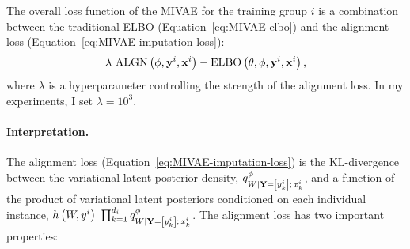 \documentclass[../thesis.tex]{subfiles}
\begin{document}
The overall loss function of the MIVAE for the training group $i$ is a combination between the traditional ELBO (Equation~\ref{eq:MIVAE-elbo}) and the alignment loss (Equation~\ref{eq:MIVAE-imputation-loss}):
\begin{equation}
    \lambda ~ \mathrm{ALGN} \left( \phi, \mathbf{{y}}^i, \mathbf{{x}}^i \right) - \mathrm{ELBO} \left( \theta, \phi, \mathbf{{y}}^i, \mathbf{{x}}^i \right),
\end{equation}
where $\lambda$ is a hyperparameter controlling the strength of the alignment loss. In my experiments, I set $\lambda = 10^3$.

\paragraph{Interpretation.} The alignment loss (Equation~\ref{eq:MIVAE-imputation-loss}) is the KL-divergence between the variational latent posterior density, $\myfunc{q}^{\phi}_{\myrv{w} | \mygroup{\myrv{y}} = \left[ \myvect{y}^i_k \right] ; \, \myvect{x}^i_k}$, and a function of the product of variational latent posteriors conditioned on each individual instance, $\myfunc{h} \left( \myrv{w}, \myvect{y}^i \right) ~ \prod_{k=1}^{\mycnt{d}_i} \myfunc{q}^{\phi}_{\myrv{w} | \mygroup{\myrv{y}} = \left[ \myvect{y}^i_k \right] ; \, \myvect{x}^i_k}$. The alignment loss has two important properties: 
\end{document}
